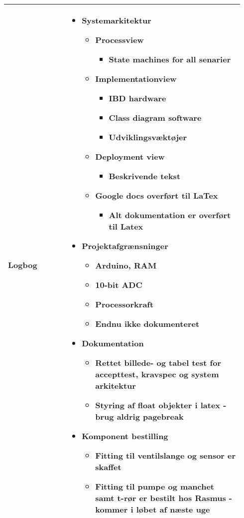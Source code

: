 \begin{longtable}{|p{0.24\linewidth}|p{0.7\linewidth}|}
		\\ \hline
		Logbog & 
		\begin{itemize}
			\item Systemarkitektur 
			\begin{itemize}
				\item Processview
				\begin{itemize}
					\item State machines for all senarier
				\end{itemize}
				\item Implementationview 
				\begin{itemize}
					\item IBD hardware
					\item Class diagram software
					\item Udviklingsvæktøjer
				\end{itemize}
				\item Deployment view
				\begin{itemize}
					\item Beskrivende tekst
				\end{itemize}
				\item Google docs overført til LaTex
				\begin{itemize}
					\item Alt dokumentation er overført til Latex 
				\end{itemize}
			\end{itemize}
			\item Projektafgrænsninger
			\begin{itemize}
				\item Arduino, RAM
				\item 10-bit ADC 
				\item Processorkraft 
				\item Endnu ikke dokumenteret 
			\end{itemize}
			\item Dokumentation
			\begin{itemize}
				\item Rettet billede- og tabel test for accepttest, kravspec og system arkitektur
				\item Styring af float objekter i latex - brug aldrig pagebreak 
			\end{itemize}
			\item Komponent bestilling
			\begin{itemize}
				\item Fitting til ventilslange og sensor er skaffet
				\item Fitting til pumpe og manchet samt t-rør er bestilt hos Rasmus - kommer i løbet af næste uge 
			\end{itemize}
		\end{itemize}
		\\ \hline
	\end{longtable}
	
